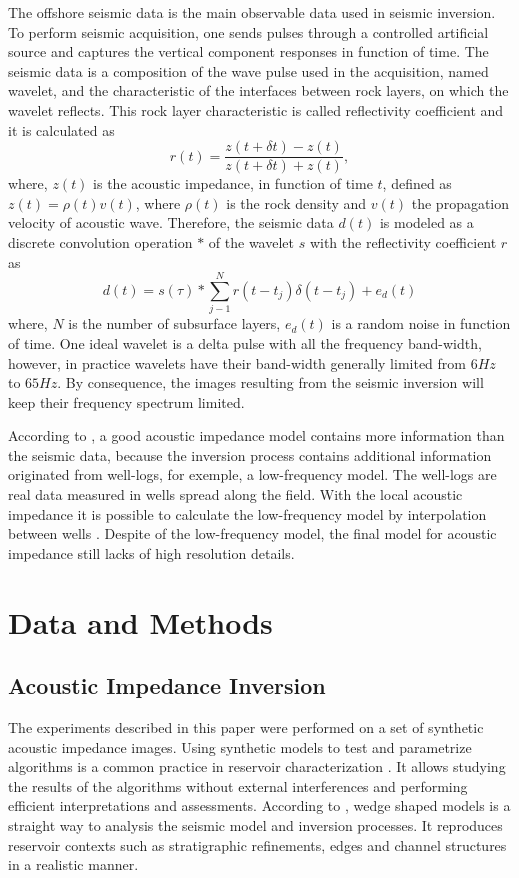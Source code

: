 \documentclass[conference,compsoc]{IEEEtran}
\begin{document}
The offshore seismic data is the main observable data used in seismic inversion. To perform seismic acquisition,
one sends pulses through a controlled artificial source and captures
the vertical component responses in function of time. The seismic data is a composition of
the wave pulse used in the acquisition, named wavelet, and the characteristic of the interfaces between rock layers,
on which the wavelet reflects. This rock layer characteristic is called reflectivity coefficient and it is
calculated as
\begin{equation}
r(t) = \frac{z(t+\delta t)-z(t)}{z(t+\delta t)+z(t)},
\label{eq:refletv}
\end{equation}
where, $z(t)$ is the acoustic impedance, in function of time $t$, defined as 
$z(t)=\rho(t)v(t)$, where $\rho(t)$ is the rock density and $v(t)$ the propagation velocity
of acoustic wave.
Therefore, the seismic data  $d(t)$ is modeled as a discrete convolution operation $*$ of the wavelet $s$ with the
reflectivity coefficient $r$ as
\begin{equation}
d(t) = s(\tau) * \sum_{j-1}^{N}{r(t- t_j) \delta(t - t_j) + e_d(t)}
\end{equation}
where, $N$ is the number of subsurface layers, $e_d(t)$ is a random noise in function of time.
One ideal wavelet is a delta pulse with all the frequency band-width, however, in practice
wavelets have their band-width generally limited from $6Hz$ to $65Hz$. By consequence,
the images resulting from the seismic inversion will keep their frequency spectrum limited.

According to \cite{Latimer}, a good acoustic impedance model contains more information
than the seismic data, because the inversion process contains additional information originated from well-logs, for
exemple, a low-frequency model.
The well-logs are real data measured in wells spread along the field.
With the local acoustic impedance it is possible to calculate the low-frequency
model by interpolation between wells \cite{Buland2003,Figueiredo2012}. Despite of the
low-frequency model, the final model for acoustic impedance still lacks of high resolution details.

\section{Data and Methods}
\subsection{Acoustic Impedance Inversion}
The experiments described in this paper were performed
on a set of synthetic acoustic impedance images. Using synthetic models
to test and parametrize algorithms is a common practice in reservoir characterization \cite{sergio}. It allows studying the
results of the algorithms without external interferences and performing efficient interpretations and assessments. 
According to \cite{Harvey}, wedge shaped models is a straight way to analysis the
seismic model and inversion processes. It reproduces
reservoir contexts such as stratigraphic refinements, edges and channel structures in a realistic manner.
\end{document}
